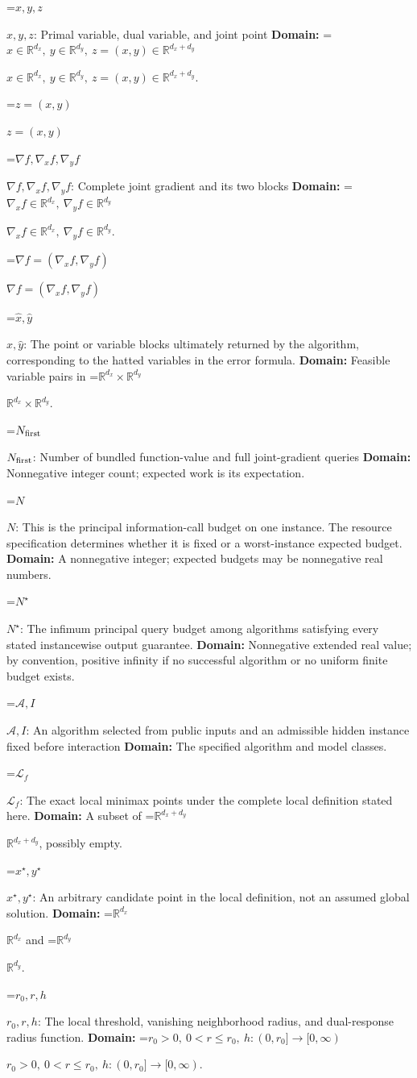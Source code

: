 \documentclass[10pt,a4paper]{article}
\newcommand{\AtlasMath}[1]{\par\begingroup\centering\setbox0=\hbox{$\displaystyle #1$}\ifdim\wd0>1.4\linewidth\typeout{ATLAS WIDE FORMULA: \the\wd0}\fi\ifdim\wd0>\linewidth\resizebox{\linewidth}{!}{\box0}\else\box0\fi\par\endgroup}
\newcommand{\AtlasInlineMath}[1]{\begingroup\setbox0=\hbox{$#1$}\ifdim\wd0>.4\linewidth\endgroup\AtlasMath{#1}\else\endgroup$#1$\fi}
\begin{document}
\AtlasInlineMath{x,y,z}: Primal variable, dual variable, and joint point \textbf{Domain:} \AtlasInlineMath{x\in\mathbb R^{d_x},\ y\in\mathbb R^{d_y},\ z=(x,y)\in\mathbb R^{d_x+d_y}}.

\AtlasInlineMath{z=(x,y)}

\AtlasInlineMath{\nabla f,\nabla_x f,\nabla_y f}: Complete joint gradient and its two blocks \textbf{Domain:} \AtlasInlineMath{\nabla_x f\in\mathbb R^{d_x},\ \nabla_y f\in\mathbb R^{d_y}}.

\AtlasInlineMath{\nabla f=(\nabla_x f,\nabla_y f)}

\AtlasInlineMath{\widehat x,\widehat y}: The point or variable blocks ultimately returned by the algorithm, corresponding to the hatted variables in the error formula. \textbf{Domain:} Feasible variable pairs in \AtlasInlineMath{\mathbb R^{d_x}\times\mathbb R^{d_y}}.

\AtlasInlineMath{N_{\rm first}}: Number of bundled function-value and full joint-gradient queries \textbf{Domain:} Nonnegative integer count; expected work is its expectation.

\AtlasInlineMath{N}: This is the principal information-call budget on one instance. The resource specification determines whether it is fixed or a worst-instance expected budget. \textbf{Domain:} A nonnegative integer; expected budgets may be nonnegative real numbers.

\AtlasInlineMath{N^\star}: The infimum principal query budget among algorithms satisfying every stated instancewise output guarantee. \textbf{Domain:} Nonnegative extended real value; by convention, positive infinity if no successful algorithm or no uniform finite budget exists.

\AtlasInlineMath{\mathcal A,I}: An algorithm selected from public inputs and an admissible hidden instance fixed before interaction \textbf{Domain:} The specified algorithm and model classes.

\AtlasInlineMath{\mathcal L_f}: The exact local minimax points under the complete local definition stated here. \textbf{Domain:} A subset of \AtlasInlineMath{\mathbb R^{d_x+d_y}}, possibly empty.

\AtlasInlineMath{x^\star,y^\star}: An arbitrary candidate point in the local definition, not an assumed global solution. \textbf{Domain:} \AtlasInlineMath{\mathbb R^{d_x}} and \AtlasInlineMath{\mathbb R^{d_y}}.

\AtlasInlineMath{r_0,r,h}: The local threshold, vanishing neighborhood radius, and dual-response radius function. \textbf{Domain:} \AtlasInlineMath{r_0>0,\ 0<r\le r_0,\ h:(0,r_0]\to[0,\infty)}.
\end{document}
